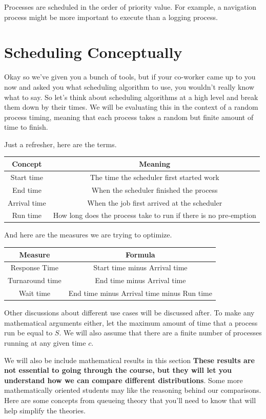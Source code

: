 Processes are scheduled in the order of priority value.
For example, a navigation process might be more important to execute than a logging process.

\section{Scheduling Conceptually}

Okay so we've given you a bunch of tools, but if your co-worker came up to you now and asked you what scheduling algorithm to use, you wouldn't really know what to say.
So let's think about scheduling algorithms at a high level and break them down by their times.
We will be evaluating this in the context of a random process timing, meaning that each process takes a random but finite amount of time to finish.

Just a refresher, here are the terms.

\begin{tabular}{|c|c|}
  Concept & Meaning \\ \hline
  Start time & The time the scheduler first started work \\
  End time & When the scheduler finished the process \\
  Arrival time & When the job first arrived at the scheduler \\
  Run time & How long does the process take to run if there is no pre-emption
\end{tabular}

And here are the measures we are trying to optimize.

\begin{tabular}{|c|c|}
  Measure & Formula \\ \hline
  Response Time & Start time minus Arrival time\\
  Turnaround time & End time minus Arrival time\\
  Wait time & End time minus Arrival time minus Run time \\
\end{tabular}

Other discussions about different use cases will be discussed after.
To make any mathematical arguments either, let the maximum amount of time that a process run be equal to $S$.
We will also assume that there are a finite number of processes running at any given time $c$.

We will also be include mathematical results in this section \textbf{These results are not essential to going through the course, but they will let you understand how we can compare different distributions}.
Some more mathematically oriented students may like the reasoning behind our comparisons.
Here are some concepts from queueing theory that you'll need to know that will help simplify the theories.

